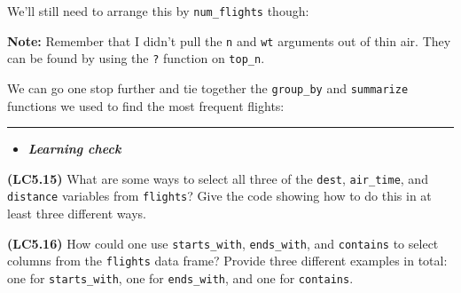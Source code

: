 \documentclass[]{tufte-book}
\newenvironment{Shaded}{\begin{snugshade}}{\end{snugshade}}
\newcommand{\KeywordTok}[1]{\textcolor[rgb]{0.13,0.29,0.53}{\textbf{{#1}}}}
\newcommand{\DataTypeTok}[1]{\textcolor[rgb]{0.13,0.29,0.53}{{#1}}}
\newcommand{\DecValTok}[1]{\textcolor[rgb]{0.00,0.00,0.81}{{#1}}}
\newcommand{\StringTok}[1]{\textcolor[rgb]{0.31,0.60,0.02}{{#1}}}
\newcommand{\NormalTok}[1]{{#1}}
\let\oldrule=\rule
\renewcommand{\rule}[1]{\oldrule{\linewidth}}
\newenvironment{rmdblock}[1]
  {\begin{shaded*}
  \begin{itemize}
  \renewcommand{\labelitemi}{
    \raisebox{-.7\height}[0pt][0pt]{
    }
  }
  \item
  }
  {
  \end{itemize}
  \end{shaded*}
  }
\newenvironment{learncheck}
  {\begin{rmdblock}{warning}}
  {\end{rmdblock}}
\begin{document}
We'll still need to arrange this by \texttt{num\_flights} though:

\begin{Shaded}
\end{Shaded}

\textbf{Note:} Remember that I didn't pull the \texttt{n} and
\texttt{wt} arguments out of thin air. They can be found by using the
\texttt{?} function on \texttt{top\_n}.

We can go one stop further and tie together the \texttt{group\_by} and
\texttt{summarize} functions we used to find the most frequent flights:

\begin{Shaded}
\end{Shaded}

\begin{center}\rule{0.5\linewidth}{\linethickness}\end{center}

\begin{learncheck}
\textbf{\emph{Learning check}}
\end{learncheck}

\textbf{(LC5.15)} What are some ways to select all three of the
\texttt{dest}, \texttt{air\_time}, and \texttt{distance} variables from
\texttt{flights}? Give the code showing how to do this in at least three
different ways.

\textbf{(LC5.16)} How could one use \texttt{starts\_with},
\texttt{ends\_with}, and \texttt{contains} to select columns from the
\texttt{flights} data frame? Provide three different examples in total:
one for \texttt{starts\_with}, one for \texttt{ends\_with}, and one for
\texttt{contains}.
\end{document}
